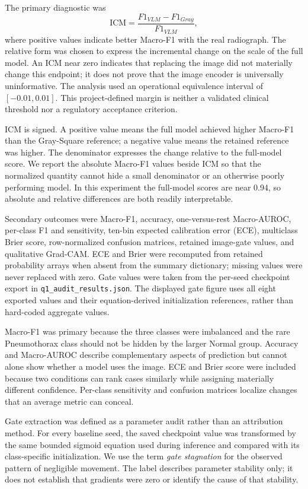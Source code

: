 \documentclass[10pt,a4paper,twocolumn]{article}
\begin{document}
The primary diagnostic was
\begin{equation}
\mathrm{ICM}=\frac{F1_{VLM}-F1_{Gray}}{F1_{VLM}},
\end{equation}
where positive values indicate better Macro-F1 with the real radiograph. The
relative form was chosen to express the incremental change on the scale of the
full model. An ICM near zero indicates that replacing the image did not
materially change this endpoint; it does not prove that the image encoder is
universally uninformative. The analysis used an operational equivalence interval
of $[-0.01,0.01]$. This project-defined margin is neither a validated clinical
threshold nor a regulatory acceptance criterion.

ICM is signed. A positive value means the full model achieved higher Macro-F1
than the Gray-Square reference; a negative value means the retained reference
was higher. The denominator expresses the change relative to the full-model
score. We report the absolute Macro-F1 values beside ICM so that the normalized
quantity cannot hide a small denominator or an otherwise poorly performing
model. In this experiment the full-model scores are near 0.94, so absolute and
relative differences are both readily interpretable.

Secondary outcomes were Macro-F1, accuracy, one-versus-rest Macro-AUROC,
per-class F1 and sensitivity, ten-bin expected calibration error (ECE),
multiclass Brier score, row-normalized confusion matrices, retained image-gate
values, and qualitative Grad-CAM. ECE and Brier were recomputed from retained
probability arrays when absent from the summary dictionary; missing values were
never replaced with zero. Gate values were taken from the per-seed checkpoint
export in \texttt{q1\_audit\_results.json}. The displayed gate figure uses all
eight exported values and their equation-derived initialization references,
rather than hard-coded aggregate values.

Macro-F1 was primary because the three classes were imbalanced and the rare
Pneumothorax class should not be hidden by the larger Normal group. Accuracy and
Macro-AUROC describe complementary aspects of prediction but cannot alone show
whether a model uses the image. ECE and Brier score were included because two
conditions can rank cases similarly while assigning materially different
confidence. Per-class sensitivity and confusion matrices localize changes that
an average metric can conceal.

Gate extraction was defined as a parameter audit rather than an attribution
method. For every baseline seed, the saved checkpoint value was transformed by
the same bounded sigmoid equation used during inference and compared with its
class-specific initialization. We use the term \emph{gate stagnation} for the
observed pattern of negligible movement. The label describes parameter
stability only; it does not establish that gradients were zero or identify the
cause of that stability.
\end{document}
